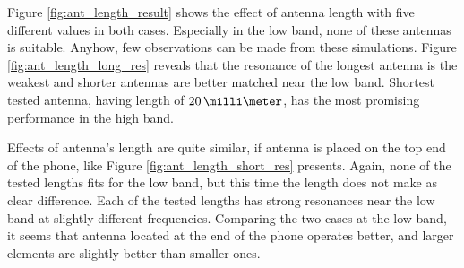 Figure \ref{fig:ant_length_result} shows the effect of antenna length with five different values in both cases. Especially in the low band, none of these antennas is suitable. Anyhow, few observations can be made from these simulations. Figure \ref{fig:ant_length_long_res} reveals that the resonance of the longest antenna is the weakest and shorter antennas are better matched near the low band. Shortest tested antenna, having length of $20\,\milli\meter$, has the most promising performance in the high band.

Effects of antenna's length are quite similar, if antenna is placed on the top end of the phone, like Figure \ref{fig:ant_length_short_res} presents. Again, none of the tested lengths fits for the low band, but this time the length does not make as clear difference. Each of the tested lengths has strong resonances near the low band at slightly different frequencies. Comparing the two cases at the low band, it seems that antenna located at the end of the phone operates better, and larger elements are slightly better than smaller ones.
